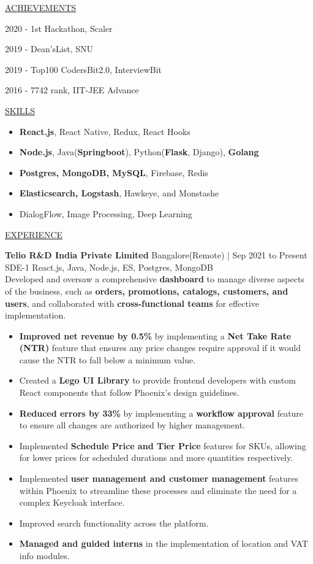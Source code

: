 \documentclass[11pt]{article}
\newcommand{\betteruline}[1]{
    \uline{#1}
}
\newcommand{\sectiontitle}[1]{
    \begingroup
        \titlebold
        \betteruline{\Large\uppercase{#1}  }
        \vspace{1.7mm}
    \endgroup
}
\newcommand{\sectioncontent}[1]{
    \begingroup
        \begin{FlushLeft}
        \vspace{-3mm}
        \sffamily\small#1
        \end{FlushLeft}
    \endgroup
    \vspace{2mm}
}
\newcommand{\job}[4]{
    \begingroup
        \textbf{\small#1}
        \hfill\color{black!70}\small{#3}
        \\
        \small#2
        \hfill\color{black!70}\small{#4}
    \endgroup
}
\newcommand{\honor}[2]{
    \textcolor{black!70}{#1} - #2 \\
    \vspace{1.5mm}
}
\begin{document}
\begin{paracol}{2}
    \sectiontitle{Achievements}
    \sectioncontent{
        \honor{2020}{1st Hackathon, Scaler}
        \honor{2019}{Dean’sList, SNU}
        \honor{2019}{Top100 CodersBit2.0, InterviewBit}
        \honor{2016}{7742 rank, IIT-JEE Advance}
    }
    

    \switchcolumn

    \sectiontitle{skills}
    \sectioncontent{
        \begin{itemize}
        \item \color{black!70}\small{\textbf{React.js}, React Native, Redux, React Hooks}
        \item \color{black!70}\small{\textbf{Node.js}, Java(\textbf{Springboot}), Python(\textbf{Flask}, Django), \textbf{Golang}}
        \item \color{black!70}\small{\textbf{Postgres, MongoDB, MySQL}, Firebase, Redis}
        \item \color{black!70}\small{\textbf{Elasticsearch, Logstash}, Hawkeye, and Monstashe}
        \item \color{black!70}\small{DialogFlow, Image Processing, Deep Learning}
        \end{itemize}
    }

    \sectiontitle{experience}
    \sectioncontent{

      \job{Telio R\&D India Private Limited}{SDE-1}{Bangalore(Remote) | Sep 2021 to Present}{React.js, Java, Node.js, ES, Postgres, MongoDB}{}\\
      \textrm{Developed and oversaw a comprehensive \textbf{dashboard} to manage diverse aspects of the business, such as \textbf{orders, promotions, catalogs, customers, and users}, and collaborated with \textbf{cross-functional teams} for effective implementation.}
      \begin{itemize}
        \item \textbf{Improved net revenue by 0.5\%} by implementing a \textbf{Net Take Rate (NTR)} feature that ensures any price changes require approval if it would cause the NTR to fall below a minimum value.
        \item Created a \textbf{Lego UI Library} to provide frontend developers with custom React components that follow Phoenix's design guidelines.
        \item \textbf{Reduced errors by 33\%} by implementing a \textbf{workflow approval} feature to ensure all changes are authorized by higher management.
        \item Implemented \textbf{Schedule Price and Tier Price} features for SKUs, allowing for lower prices for scheduled durations and more quantities respectively.
        \item Implemented \textbf{user management and customer management} features within Phoenix to streamline these processes and eliminate the need for a complex Keycloak interface.
        \item Improved search functionality across the platform.
        \item \textbf{Managed and guided interns} in the implementation of location and VAT info modules.
      \end{itemize}
      \vspace{4mm}

}
\end{paracol}
\end{document}

